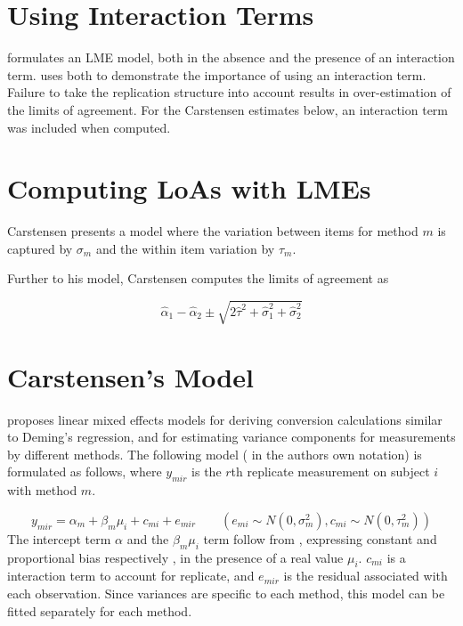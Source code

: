 \documentclass[12pt, a4paper]{report}
\theoremstyle{plain}
\theoremstyle{definition}
\theoremstyle{remark}
\begin{document}
	
	\section{Using Interaction Terms}
	\citet{BXC2008} formulates an LME model, both in the absence and the presence of an interaction term.\citet{BXC} uses both to demonstrate the importance of using an interaction term. Failure to take the replication structure into
	account results in over-estimation of the limits of agreement. For the Carstensen estimates below, an interaction term was included when computed.
	
	
	\section{Computing LoAs with LMEs}
	
	
	Carstensen presents a model where the variation between items for
	method $m$ is captured by $\sigma_m$ and the within item variation
	by $\tau_m$.
	
	Further to his model, Carstensen computes the limits of agreement
	as
	
	\[
	\hat{\alpha}_1 - \hat{\alpha}_2 \pm \sqrt{2 \hat{\tau}^2 +
		\hat{\sigma}^2_1 + \hat{\sigma}^2_2}
	\]
	
	
	
	
	\section{Carstensen's Model}
	\citet{BXC2004} proposes linear mixed effects models for deriving
	conversion calculations similar to Deming's regression, and for
	estimating variance components for measurements by different
	methods. The following model ( in the authors own notation) is
	formulated as follows, where $y_{mir}$ is the $r$th replicate
	measurement on subject $i$ with method $m$.
	
	\begin{equation}
	y_{mir}  = \alpha_{m} + \beta_{m}\mu_{i} + c_{mi} + e_{mir} \qquad
	( e_{mi} \sim N(0,\sigma^{2}_{m}), c_{mi} \sim N(0,\tau^{2}_{m}))
	\end{equation}
	The intercept term $\alpha$ and the $\beta_{m}\mu_{i}$ term follow
	from \citet{DunnSEME}, expressing constant and proportional bias
	respectively , in the presence of a real value $\mu_{i}.$
	$c_{mi}$ is a interaction term to account for replicate, and
	$e_{mir}$ is the residual associated with each observation.
	Since variances are specific to each method, this model can be
	fitted separately for each method.
	
\end{document}
